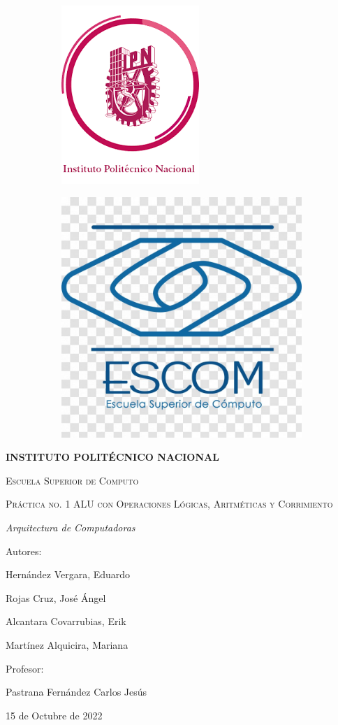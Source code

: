 	\begin{titlepage}
		\begin{figure}[!h]
			\begin{subfigure}{0.5\textwidth}
				\includegraphics[width=0.2\linewidth, inner]{logoIPN}
			\end{subfigure}
			\begin{subfigure}{0.5\textwidth}
				\includegraphics[width=0.2\linewidth, right]{logoESCOM}
			\end{subfigure}	
				
		\end{figure}		
		\centering
		\vspace{1cm}
		{\bfseries\LARGE INSTITUTO POLIT\'ECNICO NACIONAL \par}
		\vspace{1cm}
		{\scshape\Large Escuela Superior de Computo \par}
		\vspace{3cm}
		{\scshape\Huge Pr\'actica no. 1 ALU con Operaciones L\'ogicas, Aritm\'eticas y Corrimiento\par}
		\vspace{3cm}
		{\itshape\Large Arquitectura de Computadoras \par}
		\vfill
		{\Large Autores: \par}
		{\Large Hern\'andez Vergara, Eduardo \par}
		{\Large Rojas Cruz, Jos\'e \'Angel \par}
		{\Large Alcantara Covarrubias, Erik \par}
		{\Large Mart\'inez Alquicira, Mariana \par}
		\vfill
		{\Large Profesor: \par}
		{\Large Pastrana Fern\'andez Carlos Jes\'us \par}
		\vfill
		{\Large 15 de Octubre de 2022 \par}
	\end{titlepage}
